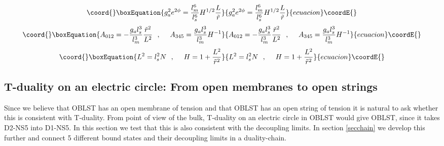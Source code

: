 \documentclass[a4paper,twoside,titlepage,12pt]{article}
\begin{document}
%
\begin{equation}\coord{}\boxEquation{
\gsna^2 e^{2\phi} = \frac{\lm^6}{\lsn^6} H^{1/2} \frac{L}{\tilde{r}}
}{
\gsna^2 e^{2\phi} = \frac{\lm^6}{\lsn^6} H^{1/2} \frac{L}{\tilde{r}}
}{ecuacion}\coordE{}\end{equation}
%
\begin{equation}\coord{}\boxEquation{
A_{012} = - \frac{\gsna \lsn^3}{\lm^3} \frac{\tilde{r}^2}{L^2}
\spa
A_{345} = \frac{\gsna \lsn^3}{\lm^3} H^{-1}
}{
A_{012} = - \frac{\gsna \lsn^3}{\lm^3} \frac{\tilde{r}^2}{L^2}
\spa
A_{345} = \frac{\gsna \lsn^3}{\lm^3} H^{-1}
}{ecuacion}\coordE{}\end{equation}
%
\begin{equation}\coord{}\boxEquation{
L^2 = \lsn^2 N \spa
H = 1 + \frac{L^2}{\tilde{r}^2}
}{
L^2 = \lsn^2 N \spa
H = 1 + \frac{L^2}{\tilde{r}^2}
}{ecuacion}\coordE{}\end{equation}
%

\subsection{T-duality on an electric circle: From open membranes 
to open strings}
\label{secTdual}

Since we believe that \coordHE{} OBLST has an open membrane of tension
\coordHE{} and that \coordHE{} OBLST has an open string of tension
\coordHE{} it is natural to ask whether this is consistent with T-duality.
From point of view of the bulk, T-duality on an electric circle 
in \coordHE{} OBLST would give \coordHE{} OBLST, since it takes
D2-NS5 into D1-NS5. 
In this section we test that this is also consistent with the 
decoupling limits. 
In section \ref{secchain} we develop this further and connect
5 different bound states and their decoupling limits
in a duality-chain.
\end{document}
